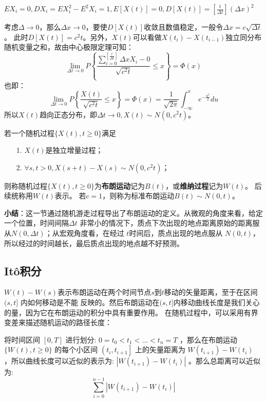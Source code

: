 \documentclass[lang=cn,newtx,10pt,scheme=chinese]{elegantbook}
\begin{document}
$EX_i = 0, DX_i = EX^2_i - E^2X_i = 1, E[X(t)]=0, D[X(t)]=[\frac{t}{\Delta t}](\Delta x)^2$

考虑$\Delta \rightarrow 0$，那么$\Delta x \rightarrow 0$，要使$D[X(t)]$收敛且数值稳定，一般令$\Delta x=c\sqrt{\Delta t}$。
此时$D[X(t)]=c^2t$。另外，$X(t)$可以看做$X(t_i) - X(t_{i-1})$独立同分布随机变量之和，故由中心极限定理可知：
\begin{equation}
  \lim _{\Delta t \rightarrow 0} P\left\{\frac{\sum_{i=0}^{\left[\frac{t}{\Delta t}\right]} \Delta x X_i-0}{\sqrt{c^2 t}} \leq x\right\}=\Phi(x)
\end{equation}
也即：
\begin{equation}
  \lim _{\Delta t \rightarrow 0} P\left\{\frac{X(t)}{\sqrt{c^2 t}} \leq x\right\}=\Phi(x)=\frac{1}{\sqrt{2 \pi}} \int_{-\infty}^x e^{-\frac{u^2}{2}} d u
\end{equation}
所以$X(t)$趋向正态分布，即$\Delta t \rightarrow 0, X(t) \sim N(0, c^2t)$。

\begin{definition}
  若一个随机过程$\{X(t), t \geq 0 \}$满足
  \begin{itemize}
    \item[1.] $X(t)$是独立增量过程；
    \item[2.] $\forall s, t>0, X(s+t)-X(s) \sim N\left(0, c^2 t\right)$；
  \end{itemize}
  则称随机过程$\{X(t), t \geq 0 \}$为\textbf{布朗运动}记为$B(t)$，或\textbf{维纳过程}记为$W(t)$。
  后续统称用$W(t)$表示。
  若$c=1$，则称为标准布朗运动$B(t)\sim N(0, t)$。
\end{definition}

\textbf{小结}：这一节通过随机游走过程导出了布朗运动的定义。从微观的角度来看，给定一个位置，时间间隔$\Delta t$
非常小的情况下，质点下次出现的地点距离原始的距离服从$N(0, \Delta t)$；从宏观角度看，在经过 
$t$时间后，质点出现的地点服从 $N(0, t)$，所以经过的时间越长，最后质点出现的地点越不好预测。
\subsection{Itô积分}
$W(t) - W(s)$表示布朗运动在两个时间节点$s$到$t$移动的矢量距离，至于在区间 $(s, t]$ 内如何移动是不能
反映的。然后布朗运动在$(s, t]$内移动曲线长度是我们关心的量，因为它在布朗运动的积分中具有重要作用。
在随机过程中，可以采用有界变差来描述随机运动的路径长度： 

将时间区间 $[0, T]$ 进行划分: $0=t_0<t_1<\ldots<t_n=T$ ，那么在布朗运动 $\{W(t), t \geq 0\}$ 的每个小区间 $\left(t_i, t_{i+1}\right]$ 上的矢量距离为 $W\left(t_{i+1}\right)-W\left(t_i\right)$ ，所以曲线长度可以近似的表示为: $\left|W\left(t_{i+1}\right)-W\left(t_i\right)\right|$ 。那么总距离可以近似为:
$$
\sum_{i=0}^{n-1}\left|W\left(t_{i+1}\right)-W\left(t_i\right)\right|
$$
\end{document}
